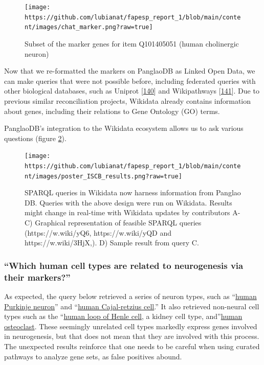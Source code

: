 \begin{figure}
\hypertarget{fig:chat_marker}{%
\centering
\texttt{[image: https://github.com/lubianat/fapesp\_report\_1/blob/main/content/images/chat\_marker.png?raw=true]}
\caption{Subset of the marker genes for item Q101405051 (human cholinergic neuron)}\label{fig:chat_marker}
}
\end{figure}

Now that we re-formatted the markers on PanglaoDB as Linked Open Data, we can make queries that were not possible before, including federated queries with other biological databases, such as Uniprot {[}\protect\hyperlink{ref-HUJ9NzAb}{140}{]}
and Wikipathways {[}\protect\hyperlink{ref-AgOOCR24}{141}{]}.
Due to previous similar reconciliation projects, Wikidata already contains information about genes, including their relations to Gene Ontology (GO) terms.

PanglaoDB's integration to the Wikidata ecosystem allows us to ask various questions (figure \ref{fig:iscb_results}).

\begin{figure}
\hypertarget{fig:iscb_results}{%
\centering
\texttt{[image: https://github.com/lubianat/fapesp\_report\_1/blob/main/content/images/poster\_ISCB\_results.png?raw=true]}
\caption{SPARQL queries in Wikidata now harness information from Panglao DB. Queries with the above design were run on Wikidata. Results might change in real-time with Wikidata updates by contributors A-C) Graphical representation of feasible SPARQL queries (https://w.wiki/yQ6, https://w.wiki/yQD and https://w.wiki/3HjX,). D) Sample result from query C.}\label{fig:iscb_results}
}
\end{figure}

\hypertarget{which-human-cell-types-are-related-to-neurogenesis-via-their-markers}{%
\subsubsection{``Which human cell types are related to neurogenesis via their markers?''}\label{which-human-cell-types-are-related-to-neurogenesis-via-their-markers}}

As expected, the query below retrieved a series of neuron types, such as ``\href{https://www.wikidata.org/wiki/Q101404913}{human Purkinje neuron}'' and ``\href{https://www.wikidata.org/wiki/Q101405091}{human Cajal-retzius cell}.'' It also retrieved non-neural cell types such as the ``\href{https://www.wikidata.org/wiki/Q101405109}{human loop of Henle cell}, a kidney cell type, and''\href{https://www.wikidata.org/wiki/Q101404928}{human osteoclast}.
These seemingly unrelated cell types markedly express genes involved in neurogenesis, but that does not mean that they are involved with this process.
The unexpected results reinforce that one needs to be careful when using curated pathways to analyze gene sets, as false positives abound.

